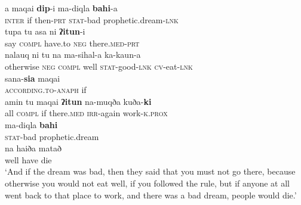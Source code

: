 \documentclass[output=paper
,modfonts
,nonflat]{langsci/langscibook}
\begin{document}
\begin{exe}
	\label{tx2-3}
	\begin{xlist}
		\ex\label{tx2-3a}
		\gll a  maqai  \textbf{dip}{}-i  ma-diqla  \textbf{bahi}-a\\
		\textsc{inter}  if  then-\textsc{prt}  \textsc{stat}-bad  prophetic.dream-\textsc{lnk}\\
		\ex\label{tx2-3b}
		\gll tupa  tu  asa  ni  \textbf{ʔitun}{}-i\\
		say  \textsc{compl}  have.to  \textsc{neg}  there.\textsc{med}-\textsc{prt}\\
		\ex\label{tx2-3c}
		\gll nalauq  ni  tu  na  ma-sihal-a  ka-kaun-a\\
		otherwise  \textsc{neg}  \textsc{compl}  well  \textsc{stat}-good-\textsc{lnk}  \textsc{cv}-eat-\textsc{lnk}\\
		\ex\label{tx2-3d}
		\gll sana-\textbf{sia}  maqai\\
		\textsc{according.to}-\textsc{anaph}  if\\
		\ex\label{tx2-3e}
		\gll amin  tu  maqai  \textbf{ʔitun}  na-muqða  kuða-\textbf{ki}\\
		all  \textsc{compl}  if  there.\textsc{med}  \textsc{irr}-again  work-\textsc{k.prox}\\
		\ex\label{tx2-3f}
		\gll ma-diqla  \textbf{bahi}\\
		\textsc{stat}-bad  prophetic.dream\\
		\ex\label{tx2-3g}
		\gll na  haiða  matað\\
		well  have  die\\
		\glt `And if the dream was bad, then they said that you must not go there, because otherwise you would not eat well, if you followed the rule, but if anyone at all went back to that place to work, and there was a bad dream, people would die.’
	\end{xlist}
\end{exe}
\end{document}
